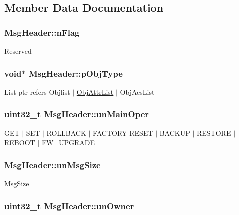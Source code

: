 \subsection{Member Data Documentation}
\hypertarget{structMsgHeader_a6b8c97c2b81c02938508b180a4af8360}{
\subsubsection[{n\-Flag}]{ Msg\-Header\-::n\-Flag}}\label{structMsgHeader_a6b8c97c2b81c02938508b180a4af8360}
Reserved \hypertarget{structMsgHeader_a72b10e80b8417cde7c83d543b0cfed71}{
\subsubsection[{p\-Obj\-Type}]{\setlength{\rightskip}{0pt plus 5cm}void$\ast$ Msg\-Header\-::p\-Obj\-Type}}\label{structMsgHeader_a72b10e80b8417cde7c83d543b0cfed71}
List ptr refers Objlist $\vert$ \hyperlink{structObjAttrList}{Obj\-Attr\-List} $\vert$ Obj\-Acs\-List \hypertarget{structMsgHeader_a669c6f42a4b2f1b5ceb28e5e8ecb689d}{
\subsubsection[{un\-Main\-Oper}]{\setlength{\rightskip}{0pt plus 5cm}uint32\-\_\-t Msg\-Header\-::un\-Main\-Oper}}\label{structMsgHeader_a669c6f42a4b2f1b5ceb28e5e8ecb689d}
G\-E\-T $\vert$ S\-E\-T $\vert$ R\-O\-L\-L\-B\-A\-C\-K $\vert$ F\-A\-C\-T\-O\-R\-Y R\-E\-S\-E\-T $\vert$ B\-A\-C\-K\-U\-P $\vert$ R\-E\-S\-T\-O\-R\-E $\vert$ R\-E\-B\-O\-O\-T $\vert$ F\-W\-\_\-\-U\-P\-G\-R\-A\-D\-E \hypertarget{structMsgHeader_a9012032bb9a4daaa98536c941394da2c}{
\subsubsection[{un\-Msg\-Size}]{ Msg\-Header\-::un\-Msg\-Size}}\label{structMsgHeader_a9012032bb9a4daaa98536c941394da2c}
Msg\-Size \hypertarget{structMsgHeader_a10f7c7b6792d6280e8efca09dd9bdcbf}{
\subsubsection[{un\-Owner}]{\setlength{\rightskip}{0pt plus 5cm}uint32\-\_\-t Msg\-Header\-::un\-Owner}}\label{structMsgHeader_a10f7c7b6792d6280e8efca09dd9bdcbf}
